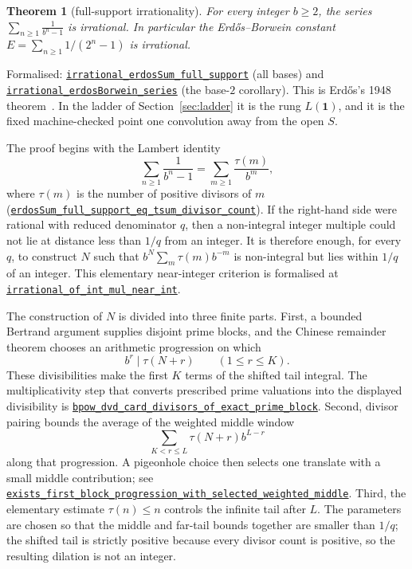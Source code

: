 \documentclass[11pt]{article}
\newcommand{\commit}{81150c1c6fdd4cd51e76d3aa0de344341e0e9e7c}
\newcommand{\repobase}{https://github.com/wcook04/plectis-lean-erdos249-257/blob/\commit}
\newcommand{\PK}{Erdos249257}
\newcommand{\lref}[3]{\href{\repobase/\PK/#1\#L#2}{\nolinkurl{#3}}}
\newcommand{\lrefx}[3]{\href{\repobase/\PK/#1\#L#2}{\nolinkurl{#3}}}
\newtheorem{theorem}{Theorem}[section]
\theoremstyle{definition}
\theoremstyle{remark}
\begin{document}
\begin{theorem}[full-support irrationality]\label{res:full}
For every integer $b\ge2$, the series $\displaystyle\sum_{n\ge1}\frac{1}{b^n-1}$ is
irrational. In particular the Erd\H{o}s--Borwein constant $E=\sum_{n\ge1}1/(2^n-1)$
is irrational.
\end{theorem}
\noindent Formalised: \lref{CertificateKernel.lean}{8000}{irrational_erdosSum_full_support}
(all bases) and \lref{CertificateKernel.lean}{8007}{irrational_erdosBorwein_series}
(the base-$2$ corollary). This is Erd\H{o}s's 1948 theorem~\cite{erdos1948}. In the ladder of
Section~\ref{sec:ladder} it is the rung $L(\mathbf 1)$, and it is the fixed
machine-checked point one convolution away from the open $S$.

The proof begins with the Lambert identity
\[
 \sum_{n\geq 1}\frac{1}{b^n-1}
   =\sum_{m\geq 1}\frac{\tau(m)}{b^m},
\]
where $\tau(m)$ is the number of positive divisors of $m$
(\lrefx{CertificateKernel.lean}{5865}{erdosSum_full_support_eq_tsum_divisor_count}).
If the right-hand side were rational with reduced denominator $q$, then a
non-integral integer multiple could not lie at distance less than $1/q$ from an
integer.  It is therefore enough, for every $q$, to construct $N$ such that
$b^N\sum_m\tau(m)b^{-m}$ is non-integral but lies within $1/q$ of an integer.
This elementary near-integer criterion is formalised at
\lrefx{CertificateKernel.lean}{5792}{irrational_of_int_mul_near_int}.

The construction of $N$ is divided into three finite parts.  First, a bounded
Bertrand argument supplies disjoint prime blocks, and the Chinese remainder
theorem chooses an arithmetic progression on which
\[
        b^r\mid \tau(N+r) \qquad (1\leq r\leq K).
\]
These divisibilities make the first $K$ terms of the shifted tail integral.
The multiplicativity step that converts prescribed prime valuations into the
displayed divisibility is
\lrefx{CertificateKernel.lean}{6177}{bpow_dvd_card_divisors_of_exact_prime_block}.
Second, divisor pairing bounds the average of the weighted middle window
\[
   \sum_{K<r\leq L}\tau(N+r)b^{L-r}
\]
along that progression.  A pigeonhole choice then selects one translate with a
small middle contribution; see
\lrefx{CertificateKernel.lean}{7246}{exists_first_block_progression_with_selected_weighted_middle}.
Third, the elementary estimate $\tau(n)\leq n$ controls the infinite tail after
$L$.  The parameters are chosen so that the middle and far-tail bounds together
are smaller than $1/q$; the shifted tail is strictly positive because every
divisor count is positive, so the resulting dilation is not an integer.
\end{document}
